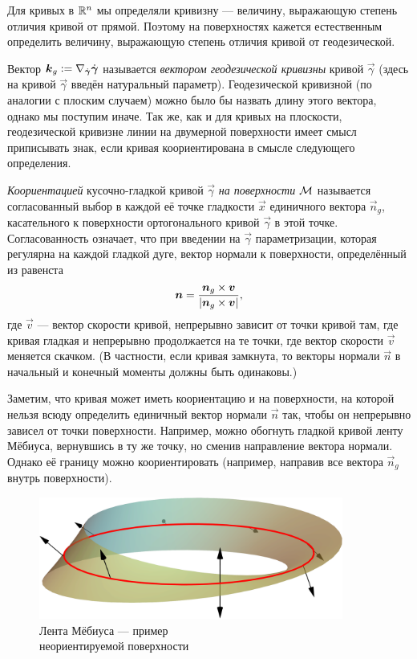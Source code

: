 Для кривых в $\R^n$ мы определяли кривизну --- величину, выражающую степень отличия кривой от прямой. Поэтому на поверхностях кажется естественным определить величину, выражающую степень отличия кривой от геодезической.

Вектор $\vec{k}_g \vcentcolon = \nabla_{\dot{\vec{\gamma}}}\dot{\vec{\gamma}}$ называется \textit{вектором геодезической кривизны} кривой $\vec{\gamma}$ (здесь на кривой $\vec{\gamma}$ введён натуральный параметр). Геодезической кривизной (по аналогии с плоским случаем) можно было бы назвать длину этого вектора, однако мы поступим иначе. Так же, как и для кривых на плоскости, геодезической кривизне линии на двумерной поверхности имеет смысл приписывать знак, если кривая коориентирована в смысле следующего определения.

\begin{definition}
	\textit{Коориентацией} кусочно-гладкой кривой $\vec{\gamma}$ \textit{на поверхности} $\M$ называется согласованный выбор в каждой её точке гладкости $\vec{x}$ единичного вектора $\vec{n}_g$, касательного к поверхности ортогонального кривой $\vec{\gamma}$ в этой точке. Согласованность означает, что при введении на $\vec{\gamma}$ параметризации, которая регулярна на каждой гладкой дуге, вектор нормали к поверхности, определённый из равенста
	\[
		\vec{n} = \frac{\vec{n}_g \times \vec{v}}{\abs{\vec{n}_g \times \vec{v}}},
	\]
	где $\vec{v}$ --- вектор скорости кривой, непрерывно зависит от точки кривой там, где кривая гладкая и непрерывно продолжается на те точки, где вектор скорости $\vec{v}$ меняется скачком. (В частности, если кривая замкнута, то векторы нормали $\vec{n}$ в начальный и конечный моменты должны быть одинаковы.)
\end{definition}

Заметим, что кривая может иметь коориентацию и на поверхности, на которой нельзя всюду определить единичный вектор нормали $\vec{n}$ так, чтобы он непрерывно зависел от точки поверхности. Например, можно обогнуть гладкой кривой ленту Мёбиуса, вернувшись в ту же точку, но сменив направление вектора нормали. Однако её границу можно коориентировать (например, направив все вектора $\vec{n}_g$ внутрь поверхности).

\begin{figure}[H]
	\centering
	\includegraphics[width=10cm]{./img/MobiusStrip.pdf}
	\caption{Лента Мёбиуса --- пример\\ неориентируемой поверхности}
\end{figure} %

